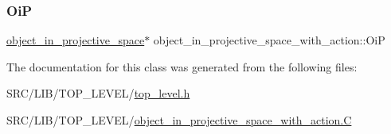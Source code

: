 \subsubsection{\texorpdfstring{OiP}{OiP}}
{\footnotesize\ttfamily \mbox{\hyperlink{classobject__in__projective__space}{object\+\_\+in\+\_\+projective\+\_\+space}}$\ast$ object\+\_\+in\+\_\+projective\+\_\+space\+\_\+with\+\_\+action\+::\+OiP}



The documentation for this class was generated from the following files\+:\begin{DoxyCompactItemize}
\item 
S\+R\+C/\+L\+I\+B/\+T\+O\+P\+\_\+\+L\+E\+V\+E\+L/\mbox{\hyperlink{top__level_8h}{top\+\_\+level.\+h}}\item 
S\+R\+C/\+L\+I\+B/\+T\+O\+P\+\_\+\+L\+E\+V\+E\+L/\mbox{\hyperlink{object__in__projective__space__with__action_8_c}{object\+\_\+in\+\_\+projective\+\_\+space\+\_\+with\+\_\+action.\+C}}\end{DoxyCompactItemize}
